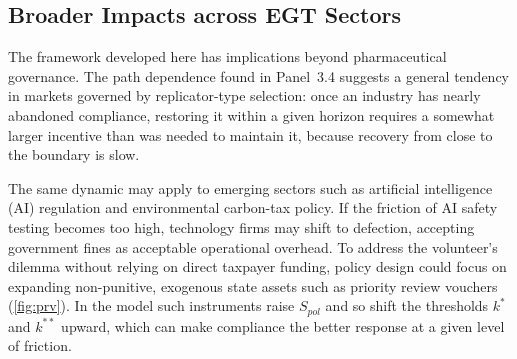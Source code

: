 \documentclass[10pt]{article}
\begin{document}
\subsection{Broader Impacts across EGT Sectors}
The framework developed here has implications beyond pharmaceutical governance. The path dependence found in Panel~3.4 suggests a general tendency in markets governed by replicator-type selection: once an industry has nearly abandoned compliance, restoring it within a given horizon requires a somewhat larger incentive than was needed to maintain it, because recovery from close to the boundary is slow.

The same dynamic may apply to emerging sectors such as artificial intelligence (AI) regulation and environmental carbon-tax policy. If the friction of AI safety testing becomes too high, technology firms may shift to defection, accepting government fines as acceptable operational overhead. To address the volunteer's dilemma without relying on direct taxpayer funding, policy design could focus on expanding non-punitive, exogenous state assets such as priority review vouchers (\cref{fig:prv}). In the model such instruments raise $S_{pol}$ and so shift the thresholds $k^*$ and $k^{**}$ upward, which can make compliance the better response at a given level of friction.
\end{document}
